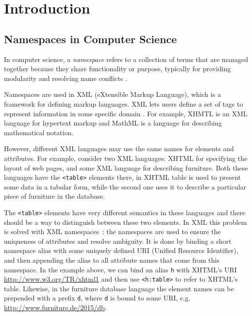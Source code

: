 \section{Introduction}

\subsection{Namespaces in Computer Science}

In computer science, a \emph{namespace} refers to a collection of terms
that are managed together because they share functionality or purpose,
typically for providing modularity
and resolving name conflicts \cite{duval2002metadata}.

Namespaces are used in XML (eXtensible Markup Language), which
is a framework for defining markup languages.
XML lets users define a set of tags to represent information in some
specific domain \cite{moller2006introduction}. For example, XHMTL is an XML
language for hypertext markup and MathML is a language for describing mathematical
notation.

However, different XML languages may use the same names for elements and attributes.
For example, consider two XML languages: XHTML for specifying the layout of web
pages, and some XML language for describing furniture. Both these languages have
the \verb|<table>| elements there, in XHTML table is used to present some data in
a tabular form, while the second one uses it to describe a particular piece of
furniture in the database.

The \verb|<table>| elements have very different semantics in these languages
and there should be a way to distinguish between these two elements.
In XML this problem is solved with XML namespaces~\cite{xmlnamespaces}:
the namespaces are used to ensure the uniqueness of attributes and resolve ambiguity.
It is done by binding a short namespace alias with some uniquely defined URI
(Unified Resource Identifier), and then appending the alias to
all attribute names that come from this namespace. In the example above,
we can bind an alias \verb|h| with XHTML's URI \url{http://www.w3.org/TR/xhtml1}
and then use \verb|<h:table>| to refer to XHTML's table. Likewise,
in the furniture database language the element names can be prepended
with a prefix \verb|d|, where \verb|d| is bound to some URI, e.g.
\url{http://www.furniture.de/2015/db}.




